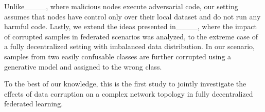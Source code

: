 Unlike____, where malicious nodes execute adversarial code, our setting assumes that nodes have control only over their local dataset and do not run any harmful code. Lastly, we extend the ideas presented in____, where the impact of corrupted samples in federated scenarios was analyzed, to the extreme case of a fully decentralized setting with imbalanced data distribution. In our scenario, samples from two easily confusable classes are further corrupted using a generative model and assigned to the wrong class.

To the best of our knowledge, this is the first study to jointly investigate the effects of data corruption on a complex network topology in fully decentralized federated learning.
